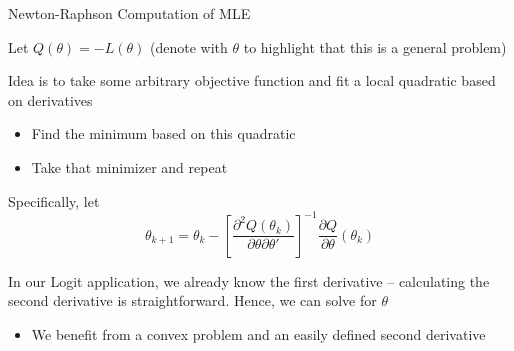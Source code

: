 \documentclass[notes,11pt, aspectratio=169]{beamer}
\newenvironment{wideitemize}{\itemize\addtolength{\itemsep}{10pt}}{\enditemize}
\begin{document}
  \begin{frame}{Newton-Raphson Computation of MLE}
    \begin{wideitemize}
    \item Let $Q(\theta) = -L(\theta)$ (denote with $\theta$ to
      highlight that this is a general problem)
    \item Idea is to take some arbitrary objective function and fit a
      local quadratic based on derivatives
      \begin{itemize}
      \item Find the minimum based on this quadratic
      \item Take that minimizer and repeat
      \end{itemize}
    \item Specifically, let
      $$ \theta_{k+1} = \theta_{k} - \left[\frac{\partial^{2}Q(\theta_{k})}{\partial\theta \partial \theta'}\right]^{-1}\frac{\partial Q}{\partial \theta}(\theta_{k})$$
    \item In our Logit application, we already know the first derivative -- calculating the second derivative is straightforward. Hence, we can solve for $\theta$
      \begin{itemize}
      \item We benefit from a convex problem and an easily defined second derivative
      \end{itemize}
    \end{wideitemize}
  \end{frame}
\end{document}

